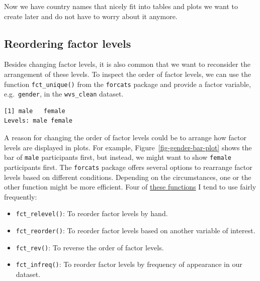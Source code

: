 \documentclass[
  letterpaper,
  DIV=11,
  numbers=noendperiod]{scrreprt}
\newenvironment{Shaded}{\begin{snugshade}}{\end{snugshade}}
\newcommand{\FunctionTok}[1]{\textcolor[rgb]{0.28,0.35,0.67}{#1}}
\newcommand{\NormalTok}[1]{\textcolor[rgb]{0.00,0.23,0.31}{#1}}
\newcommand{\SpecialCharTok}[1]{\textcolor[rgb]{0.37,0.37,0.37}{#1}}
\begin{document}
Now we have country names that nicely fit into tables and plots we want
to create later and do not have to worry about it anymore.

\subsection{Reordering factor
levels}\label{sec-reordering-factor-levels}

Besides changing factor levels, it is also common that we want to
reconsider the arrangement of these levels. To inspect the order of
factor levels, we can use the function \texttt{fct\_unique()} from the
\texttt{forcats} package and provide a factor variable,
e.g.~\texttt{gender}, in the \texttt{wvs\_clean} dataset.

\begin{Shaded}
\end{Shaded}

\begin{verbatim}
[1] male   female
Levels: male female
\end{verbatim}

A reason for changing the order of factor levels could be to arrange how
factor levels are displayed in plots. For example,
Figure~\ref{fig-gender-bar-plot} shows the bar of \texttt{male}
participants first, but instead, we might want to show \texttt{female}
participants first. The \texttt{forcats} package offers several options
to rearrange factor levels based on different conditions. Depending on
the circumstances, one or the other function might be more efficient.
Four of \href{https://forcats.tidyverse.org/reference/index.html}{these
functions} I tend to use fairly frequently:

\begin{itemize}
\item
  \texttt{fct\_relevel()}: To reorder factor levels by hand.
\item
  \texttt{fct\_reorder()}: To reorder factor levels based on another
  variable of interest.
\item
  \texttt{fct\_rev()}: To reverse the order of factor levels.
\item
  \texttt{fct\_infreq()}: To reorder factor levels by frequency of
  appearance in our dataset.
\end{itemize}
\end{document}
